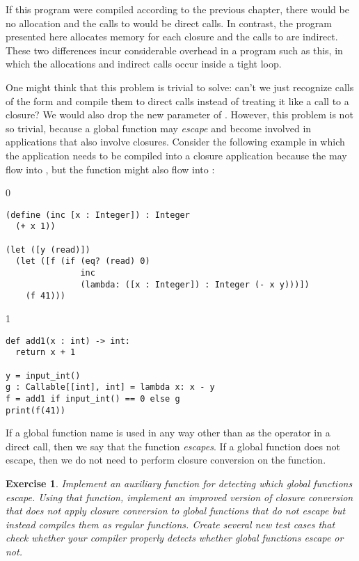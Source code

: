 \documentclass[7x10]{TimesAPriori_MIT}%
\def\racketEd{0}
\def\pythonEd{1}
\def\edition{1}
\newcommand{\pythonColor}[0]{}
\newtheorem{exercise}[theorem]{Exercise}
\numberwithin{theorem}{chapter}
\numberwithin{definition}{chapter}
\numberwithin{equation}{chapter}
\begin{document}
If this program were compiled according to the previous chapter, there
would be no allocation and the calls to  would be
direct calls. In contrast, the program presented here allocates memory
for each closure and the calls to  are indirect. These
two differences incur considerable overhead in a program such as this,
in which the allocations and indirect calls occur inside a tight loop.

One might think that this problem is trivial to solve: can't we just
recognize calls of the form 
and compile them to direct calls instead of treating it like a call to
a closure? We would also drop the new  parameter of
.
%
However, this problem is not so trivial, because a global function may
\emph{escape} and become involved in applications that also involve
closures. Consider the following example in which the application
 needs to be compiled into a closure
application because the  may flow into , but the
 function might also flow into :
\begin{center}
\begin{minipage}{\textwidth}
{\if\edition\racketEd  
\begin{lstlisting}
(define (inc [x : Integer]) : Integer
  (+ x 1))

(let ([y (read)])
  (let ([f (if (eq? (read) 0)
               inc
               (lambda: ([x : Integer]) : Integer (- x y)))])
    (f 41)))
\end{lstlisting}
\fi}
{\if\edition\pythonEd\pythonColor  
\begin{lstlisting}
def add1(x : int) -> int:
  return x + 1

y = input_int()
g : Callable[[int], int] = lambda x: x - y
f = add1 if input_int() == 0 else g
print(f(41))
\end{lstlisting}
\fi}
\end{minipage}
\end{center}
If a global function name is used in any way other than as the
operator in a direct call, then we say that the function
\emph{escapes}. If a global function does not escape, then we do not
need to perform closure conversion on the function.

\begin{exercise}\normalfont\normalsize
  Implement an auxiliary function for detecting which global
  functions escape. Using that function, implement an improved version
  of closure conversion that does not apply closure conversion to
  global functions that do not escape but instead compiles them as
  regular functions. Create several new test cases that check whether
  your compiler properly detects whether global functions escape or not.
\end{exercise}
\end{document}

